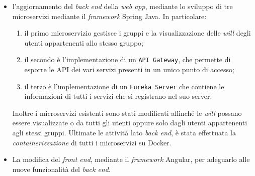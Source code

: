 \begin{itemize}
      \item l'aggiornamento del \textit{back
                  end} della \textit{web app}, mediante lo sviluppo di tre
            microservizi
            mediante il \textit{framework} Spring Java.
            In particolare:
            \begin{enumerate}
                  \item il primo microservizio	gestisce i gruppi e la
                        visualizzazione delle
                        \textit{will}
                        degli utenti appartenenti allo stesso gruppo;
                  \item il secondo è l'implementazione di un
                        \texttt{API Gateway}, che permette di esporre le
                        API dei vari servizi
                        presenti in un
                        unico punto di accesso;
                  \item il terzo è l'implementazione di un \texttt{Eureka
                              Server}
                        che
                        contiene le informazioni di tutti i servizi che si
                        registrano nel suo server.
            \end{enumerate}
            Inoltre i microservizi esistenti sono stati modificati affinché le
            \textit{will} possano essere visualizzate o da tutti gli utenti oppure solo
            dagli utenti appartenenti agli stessi gruppi.
            Ultimate le attività lato \textit{back end}, è stata effettuata la
            \textit{containerizzazione} di tutti i microservizi su
            Docker.
      \item La modifica del \textit{front end},
            mediante il \textit{framework} Angular, per adeguarlo alle nuove
            funzionalità del
            \textit{back end}.
\end{itemize}

%
%

\endgroup

\vfill